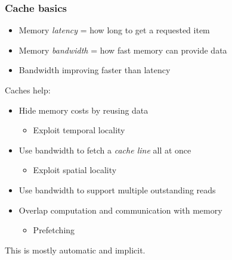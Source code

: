 \documentclass{beamer}
\begin{document}
\begin{frame}
  \frametitle{Cache basics}

  \begin{itemize}
  \item Memory {\em latency} = how long to get a requested item
  \item Memory {\em bandwidth} = how fast memory can provide data
  \item Bandwidth improving faster than latency
  \end{itemize}

  Caches help:
  \begin{itemize}
  \item Hide memory costs by reusing data
    \begin{itemize}
    \item Exploit temporal locality
    \end{itemize}
  \item Use bandwidth to fetch a {\em cache line} all at once
    \begin{itemize}
    \item Exploit spatial locality
    \end{itemize}
  \item Use bandwidth to support multiple outstanding reads
  \item Overlap computation and communication with memory
    \begin{itemize}
    \item Prefetching
    \end{itemize}
  \end{itemize}

  This is mostly automatic and implicit.

\end{frame}
\end{document}
